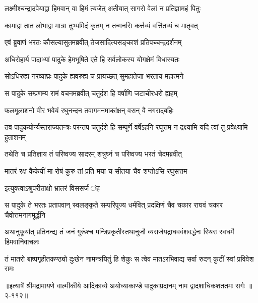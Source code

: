 \twolineshloka
{लक्ष्मीश्चन्द्रादपेयाद्वा हिमवान् वा हिमं त्यजेत्}
{अतीयात् सागरो वेलां न प्रतिज्ञामहं पितुः} %

\twolineshloka
{कामाद्वा तात लोभाद्वा मात्रा तुभ्यमिदं कृतम्}
{न तन्मनसि कर्त्तव्यं वर्त्तितव्यं च मातृवत्} %

\twolineshloka
{एवं ब्रुवाणं भरतः कौसल्यासुतमब्रवीत्}
{तेजसादित्यसङ्काशं प्रतिपच्चन्द्रदर्शनम्} %

\twolineshloka
{अधिरोहार्य पादाभ्यां पादुके हेमभूषिते}
{एते हि सर्वलोकस्य योगक्षेमं विधास्यतः} %

\twolineshloka
{सोऽधिरुह्य नरव्याघ्रः पादुके ह्यवरुह्य च}
{प्रायच्छत् सुमहातेजा भरताय महात्मने} %

\twolineshloka
{स पादुके सम्प्रणम्य रामं वचनमब्रवीत्}
{चतुर्दश हि वर्षाणि जटाचीरधरो ह्यहम्} %

\twolineshloka
{फलमूलाशनो वीर भवेयं रघुनन्दन}
{तवागमनमाकांक्षन् वसन् वै नगराद्बहिः} %

\threelineshloka
{तव पादुकयोर्न्यस्तराज्यतन्त्रः परन्तप}
{चतुर्दशे हि सम्पूर्णे वर्षेऽहनि रघूत्तम}
{न द्रक्ष्यामि यदि त्वां तु प्रवेक्ष्यामि हुताशनम्} %

\twolineshloka
{तथेति च प्रतिज्ञाय तं परिष्वज्य सादरम्}
{शत्रुघ्नं च परिष्वज्य भरतं चेदमब्रवीत्} %

\twolineshloka
{मातरं रक्ष कैकेयीं मा रोषं कुरु तां प्रति}
{मया च सीतया चैव शप्तोऽसि रघुसत्तम} %

\onelineshloka
{इत्युक्त्वाऽश्रुपरीताक्षो भ्रातरं विससर्ज ऺह} %

\twolineshloka
{स पादुके ते भरतः प्रतापवान् स्वलङ्कृते सम्परिपूज्य धर्मवित्}
{प्रदक्षिणं चैव चकार राघवं चकार चैवोत्तमनागमूर्द्धनि} %

\twolineshloka
{अथानुपूर्व्यात् प्रतिनन्द्य तं जनं गुरूंश्च मन्त्रिप्रकृतीस्तथानुजौ}
{व्यसर्जयद्राघववंशवर्द्धनः स्थिरः स्वधर्मे हिमवानिवाचलः} %

\twolineshloka
{तं मातरो बाष्पगृहीतकण्ठ्यो दुःखेन नामन्त्रयितुं हि शेकुः}
{स त्वेव मातऽरभिवाद्य सर्वा रुदन् कुटीं स्वां प्रविवेश रामः} %


॥इत्यार्षे श्रीमद्रामायणे वाल्मीकीये आदिकाव्ये अयोध्याकाण्डे पादुकाप्रदानम् नाम द्वादशाधिकशततमः सर्गः ॥२-११२॥
